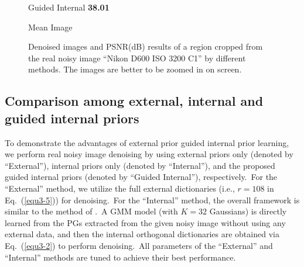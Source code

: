 \begin{figure}
{\begin{minipage}[t]{0.19\textwidth}
{\footnotesize Guided Internal \textbf{38.01}}
\end{minipage}
\begin{minipage}[t]{0.19\textwidth}
\centering
{}
{\footnotesize Mean Image}
\end{minipage}
}
    \caption{Denoised images and PSNR(dB) results of a region cropped from the real noisy image ``Nikon D600 ISO 3200 C1'' \cite{crosschannel2016} by different methods. The images are better to be zoomed in on screen.}
    \label{fig3-8}
\end{figure}


\subsection{Comparison among external, internal and guided internal priors}

To demonstrate the advantages of external prior guided internal prior learning, we perform real noisy image denoising by using external priors only (denoted by ``External''), internal priors only (denoted by ``Internal''), and the proposed guided internal priors (denoted by ``Guided Internal''), respectively.\ For the ``External'' method, we utilize the full external dictionaries (i.e., $r=108$ in Eq.\ (\ref{equ3-5})) for denoising.\ For the ``Internal'' method, the overall framework is similar to the method of \cite{ncsr}.\ A GMM model (with $K = 32$ Gaussians) is directly learned from the PGs extracted from the given noisy image without using any external data, and then the internal orthogonal dictionaries are obtained via Eq.\ (\ref{equ3-2}) to perform denoising.\ All parameters of the ``External'' and ``Internal'' methods are tuned to achieve their best performance. 

